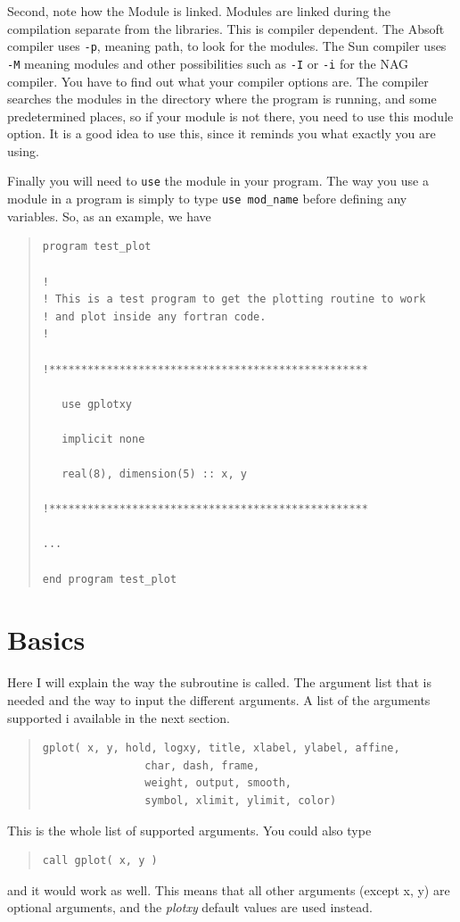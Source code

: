 \documentclass{article}
\begin{document}
Second, note how the Module is linked. Modules are linked during the compilation separate from the libraries. This is compiler dependent. The Absoft compiler uses \texttt{-p}, meaning path, to look for the modules. The Sun compiler uses \texttt{-M} meaning modules and other possibilities such as \texttt{-I} or \texttt{-i} for the NAG compiler. You have to find out what your compiler options are. The compiler searches the modules in the directory where the program is running, and some predetermined places, so if your module is not there, you need to use this module option. It is a good idea to use this, since it reminds you what exactly you are using. 

Finally you will need to \texttt{use} the module in your program. The way you use a module in a program is simply to type \texttt{use mod\_name} before defining any variables. So, as an example, we have
\begin{quote}
\begin{verbatim}
program test_plot

!
! This is a test program to get the plotting routine to work
! and plot inside any fortran code.
!

!**************************************************

   use gplotxy

   implicit none

   real(8), dimension(5) :: x, y

!**************************************************

...

end program test_plot
\end{verbatim}
\end{quote}


\section{Basics}
Here I will explain the way the subroutine is called. The argument list that is needed and the way to input the different arguments. A list of the arguments supported i available in the next section. 
\begin{quote}
\begin{verbatim}
gplot( x, y, hold, logxy, title, xlabel, ylabel, affine,   
   				char, dash, frame,   
   				weight, output, smooth,      
   				symbol, xlimit, ylimit, color)
\end{verbatim}
\end{quote}
This is the whole list of supported arguments. You could also type
\begin{quote}
\begin{verbatim}
call gplot( x, y )
\end{verbatim}
\end{quote}
and it would work as well. This means that all other arguments (except x, y) are optional arguments, and the {\it plotxy} default values are used instead. 
\end{document}
